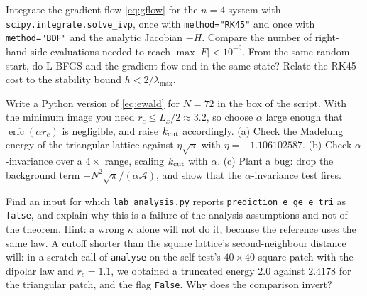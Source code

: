 \begin{exercise}
Integrate the gradient flow \eqref{eq:gflow} for the $n=4$ system with \texttt{scipy.integrate.solve\_ivp}, once with
\texttt{method="RK45"} and once with \texttt{method="BDF"} and the analytic Jacobian $-H$. Compare the number of
right-hand-side evaluations needed to reach $\max|F|<10^{-9}$. From the same random start, do L-BFGS and the gradient flow
end in the same state? Relate the RK45 cost to the stability bound $h<2/\lambda_{\max}$.
\end{exercise}

\begin{exercise}\label{ex:num-ewald}
Write a Python version of \eqref{eq:ewald} for $N=72$ in the box of the script. With the minimum image you need
$r_c\le L_x/2\approx3.2$, so choose $\alpha$ large enough that $\operatorname{erfc}(\alpha r_c)$ is negligible, and
raise $k_{\rm cut}$ accordingly. (a) Check the Madelung energy of the
triangular lattice against $\eta\sqrt\pi$ with $\eta=-1.106102587$. (b) Check $\alpha$-invariance over a $4\times$ range,
scaling $k_{\rm cut}$ with $\alpha$. (c) Plant a bug: drop the background term $-N^2\sqrt\pi/(\alpha\mathcal A)$, and
show that the $\alpha$-invariance test fires.
\end{exercise}

\begin{exercise}\label{ex:num-lab}
Find an input for which \texttt{lab\_analysis.py} reports \texttt{prediction\_e\_ge\_e\_tri} as \texttt{false}, and
explain why this is a failure of the analysis assumptions and not of the theorem. Hint: a wrong $\kappa$ alone will not
do it, because the reference uses the same law. A cutoff shorter than the square lattice's second-neighbour distance
will: in a scratch call of \texttt{analyse} on the self-test's $40\times40$ square patch with the dipolar law and
$r_c=1.1$, we obtained a truncated energy $2.0$ against $2.4178$ for the triangular patch, and the flag \texttt{False}.
Why does the comparison invert?
\end{exercise}
